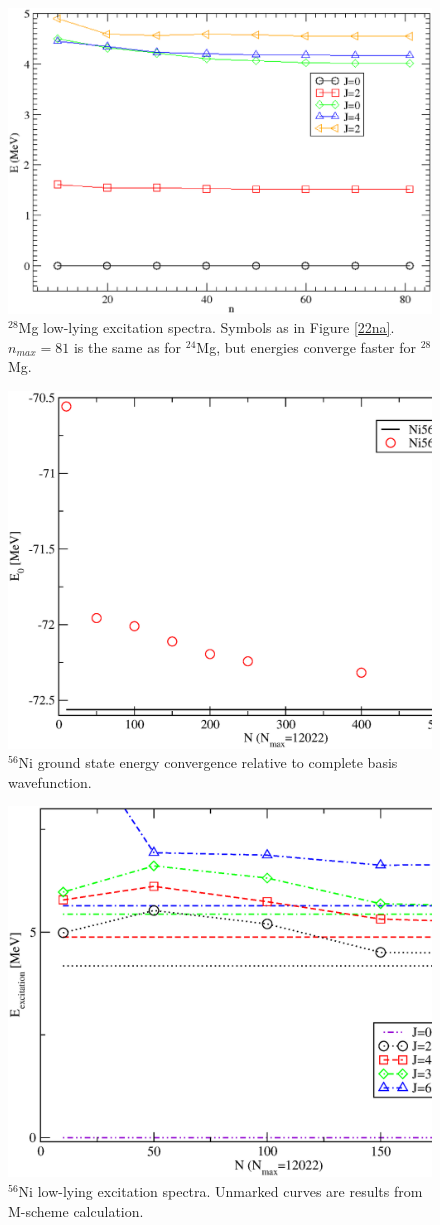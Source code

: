 \begin{figure}
    \centering
    \includegraphics[width=.75\textwidth,clip]{Figures/pnism_ex_28mg}
    \caption{$^{28}$Mg low-lying excitation spectra. Symbols as in Figure \ref{22na}. \boldmath$n_{max}=81$ is the same as for $^{24}$Mg,
    but energies converge faster for $^{28}$Mg.}
\end{figure}
\begin{figure}
    \centering
    \includegraphics[width=.75\textwidth,clip]{Figures/E0_Ni56}
    \caption{$^{56}$Ni ground state energy convergence relative to complete basis wavefunction. }
\end{figure}
\begin{figure}
    \centering
    \includegraphics[width=.75\textwidth,clip]{Figures/Ni56}
    \caption{$^{56}$Ni low-lying excitation spectra. Unmarked curves are results from M-scheme calculation.}
\end{figure}
